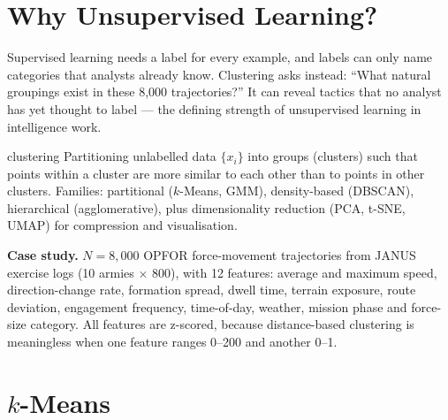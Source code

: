 \documentclass[11pt]{article}
\begin{document}
\tableofcontents
\newpage

\section{Why Unsupervised Learning?}
Supervised learning needs a label for every example, and labels can only name categories that analysts already know. Clustering asks instead: ``What natural groupings exist in these 8,000 trajectories?'' It can reveal tactics that no analyst has yet thought to label --- the defining strength of unsupervised learning in intelligence work.
\begin{definition}{clustering}
Partitioning unlabelled data $\{x_i\}$ into groups (clusters) such that points within a cluster are more similar to each other than to points in other clusters. Families: partitional ($k$-Means, GMM), density-based (DBSCAN), hierarchical (agglomerative), plus dimensionality reduction (PCA, t-SNE, UMAP) for compression and visualisation.
\end{definition}
\textbf{Case study.} $N=8{,}000$ OPFOR force-movement trajectories from JANUS exercise logs (10 armies $\times$ 800), with 12 features: average and maximum speed, direction-change rate, formation spread, dwell time, terrain exposure, route deviation, engagement frequency, time-of-day, weather, mission phase and force-size category. All features are z-scored, because distance-based clustering is meaningless when one feature ranges 0--200 and another 0--1.

\section{$k$-Means}
\end{document}
